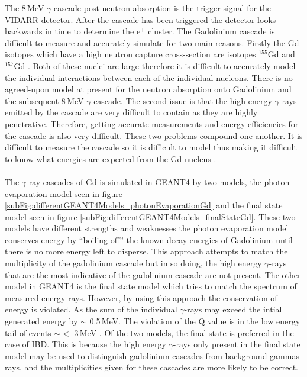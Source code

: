 The 8\,MeV $\gamma$ cascade post neutron absorption is the trigger signal for the VIDARR detector. After the cascade has been triggered the detector looks backwards in time to determine the e$^+$ cluster. The Gadolinium cascade is difficult to measure and accurately simulate for two main reasons. Firstly the Gd isotopes which have a high neutron capture cross-section are isotopes $^{155}$Gd and $^{157}$Gd \cite{molnar_2004}. Both of these nuclei are large therefore it is difficult to accurately model the individual interactions between each of the individual nucleons. There is no agreed-upon model at present for the neutron absorption onto Gadolinium and the subsequent 8\,MeV $\gamma$ cascade. The second issue is that the high energy $\gamma$-rays emitted by the cascade are very difficult to contain as they are highly penetrative. Therefore, getting accurate measurements and energy efficiencies for the cascade is also very difficult. These two problems compound one another. It is difficult to measure the cascade so it is difficult to model thus making it difficult to know what energies are expected from the Gd nucleus \cite{molnar_2004}. 
\\\\The $\gamma$-ray cascades of Gd is simulated in GEANT4 by two models, the photon evaporation model seen in figure \ref{subFig:differentGEANT4Models_photonEvaporationGd} and the final state model seen in figure \ref{subFig:differentGEANT4Models_finalStateGd}. These two models have different strengths and weaknesses the photon evaporation model conserves energy by ``boiling off'' the known decay energies of Gadolinium until there is no more energy left to disperse. This approach attempts to match the multiplicity of the gadolinium cascade but in so doing, the high energy $\gamma$-rays that are the most indicative of the gadolinium cascade are not present. The other model in GEANT4 is the final state model which tries to match the spectrum of measured energy rays. However, by using this approach the conservation of energy is violated. As the sum of the individual $\gamma$-rays may exceed the intial generated energy by $\sim$ 0.5\,MeV. The violation of the Q value is in the low energy tail of events $\sim <$ 3\,MeV \cite{YuChen_2015}. Of the two models, the final state is preferred in the case of IBD. This is because the high energy $\gamma$-rays only present in the final state model may be used to distinguish gadolinium cascades from background gammas rays, and the multiplicities given for these cascades are more likely to be correct.

